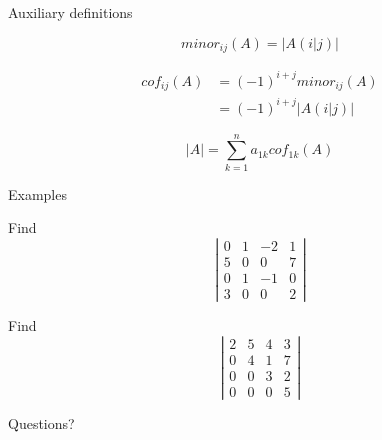 \documentclass{beamer}
\begin{document}
\begin{frame}{Auxiliary definitions}
  \begin{definition}[Minor]
    \begin{equation*}
      minor_{ij}(A) = \left|A(i| j)\right|
    \end{equation*}
  \end{definition}\vfill
  \begin{definition}[Cofactor]
    \begin{align*}
      cof_{ij}(A) &= (-1)^{i+j}minor_{ij}(A)\\
                  &= (-1)^{i+j}\left|A(i| j)\right|
    \end{align*}
  \end{definition}\vfill
  \begin{lemma}
    \begin{equation*}
      \left|A\right| = \sum_{k=1}^na_{1k}cof_{1k}(A)
    \end{equation*}
  \end{lemma}
\end{frame}

\begin{frame}{Examples}
  \begin{example}
    Find
    \begin{equation*}
      \left|
	\begin{array}{cccc}
          0&1&-2&1\\
          5&0&0&7\\
          0&1&-1&0\\
          3&0&0&2
	\end{array}
      \right|
    \end{equation*}
  \end{example}
  \begin{example}
    Find
    \begin{equation*}
      \left|
	\begin{array}{cccc}
          2&5&4&3\\
          0&4&1&7\\
          0&0&3&2\\
          0&0&0&5
	\end{array}
      \right|
    \end{equation*}
  \end{example}
\end{frame}

\begin{frame}
  Questions?
\end{frame}
\end{document}
